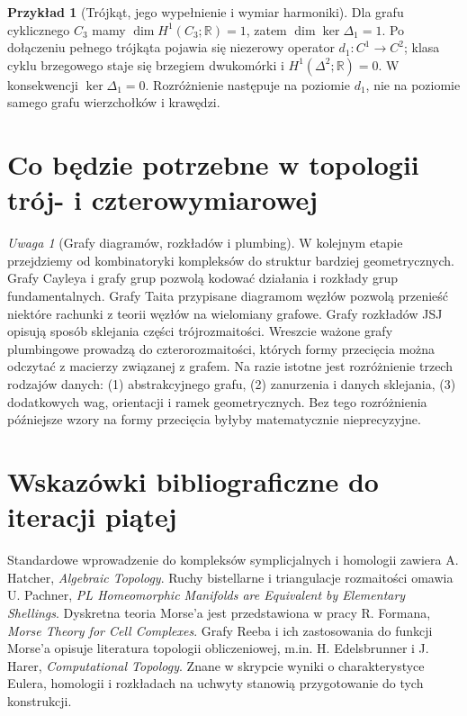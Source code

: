 \documentclass[11pt,a4paper]{report}
\numberwithin{equation}{section}
\theoremstyle{plain}
\theoremstyle{definition}
\newtheorem{przyklad}[twierdzenie]{Przykład}
\theoremstyle{remark}
\newtheorem{uwaga}[twierdzenie]{Uwaga}
\begin{document}
\begin{przyklad}[Trójkąt, jego wypełnienie i wymiar harmoniki]
Dla grafu cyklicznego $C_3$ mamy
$\dim H^1(C_3;\mathbb R)=1$, zatem
$\dim\ker\Delta_1=1$. Po dołączeniu
pełnego trójkąta pojawia się niezerowy operator
$d_1:C^1\to C^2$; klasa cyklu brzegowego staje
się brzegiem dwukomórki i
$H^1(\Delta^2;\mathbb R)=0$.
W konsekwencji $\ker\Delta_1=0$.
Rozróżnienie następuje na poziomie $d_1$,
nie na poziomie samego grafu wierzchołków i krawędzi.
\end{przyklad}

\section{Co będzie potrzebne w topologii trój- i czterowymiarowej}
\label{sec:tg-roadmap-topology}

\begin{uwaga}[Grafy diagramów, rozkładów i plumbing]
W kolejnym etapie przejdziemy od kombinatoryki
kompleksów do struktur bardziej geometrycznych.
Grafy Cayleya i grafy grup pozwolą kodować działania
i rozkłady grup fundamentalnych. Grafy Taita
przypisane diagramom węzłów pozwolą przenieść
niektóre rachunki z teorii węzłów na wielomiany grafowe.
Grafy rozkładów JSJ opisują sposób sklejania części
trójrozmaitości. Wreszcie ważone grafy plumbingowe
prowadzą do czterorozmaitości, których formy przecięcia
można odczytać z macierzy związanej z grafem.
Na razie istotne jest rozróżnienie trzech rodzajów danych:
(1) abstrakcyjnego grafu, (2) zanurzenia i danych sklejania,
(3) dodatkowych wag, orientacji i ramek geometrycznych.
Bez tego rozróżnienia późniejsze wzory na formy przecięcia
byłyby matematycznie nieprecyzyjne.
\end{uwaga}

\section*{Wskazówki bibliograficzne do iteracji piątej}
Standardowe wprowadzenie do kompleksów symplicjalnych i
homologii zawiera A. Hatcher, \emph{Algebraic Topology}.
Ruchy bistellarne i triangulacje rozmaitości omawia
U. Pachner, \emph{PL Homeomorphic Manifolds are Equivalent
by Elementary Shellings}.
Dyskretna teoria Morse'a jest przedstawiona w pracy
R. Formana, \emph{Morse Theory for Cell Complexes}.
Grafy Reeba i ich zastosowania do funkcji Morse'a
opisuje literatura topologii obliczeniowej, m.in.
H. Edelsbrunner i J. Harer, \emph{Computational Topology}.
Znane w skrypcie wyniki o charakterystyce Eulera,
homologii i rozkładach na uchwyty stanowią
przygotowanie do tych konstrukcji.
\end{document}

